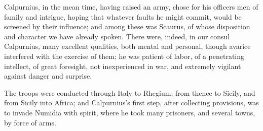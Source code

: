 Calpurnius, in the mean time, having raised an army, chose for his
officers men of family and intrigue, hoping that whatever faults he
might commit, would be screened by their influence; and among these
was Scaurus, of whose disposition and character we have already
spoken. There were, indeed, in our consul Calpurnius, many excellent
qualities, both mental and personal, though avarice interfered with
the exercise of them; he was patient of labor, of a penetrating
intellect, of great foresight, not inexperienced in war, and extremely
vigilant against danger and surprise.

The troops were conducted through Italy to Rhegium, from thence to
Sicily, and from Sicily into Africa; and Calpurnius's first step,
after collecting provisions, was to invade Numidia with spirit, where
he took many prisoners, and several towns, by force of arms.

